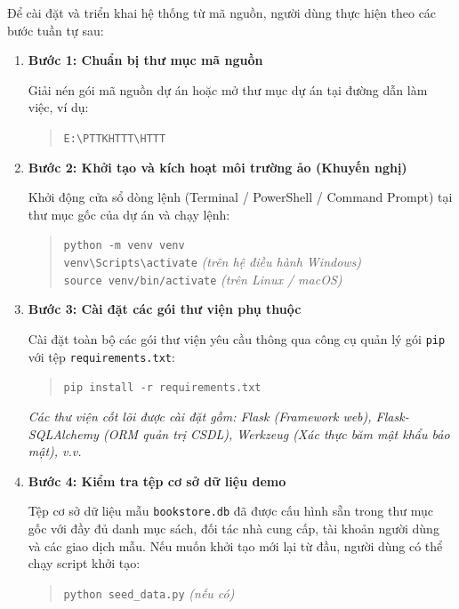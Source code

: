 \documentclass[12pt,a4paper]{article}
\begin{document}
Để cài đặt và triển khai hệ thống từ mã nguồn, người dùng thực hiện theo các bước tuần tự sau:

\begin{enumerate}
    \item \textbf{Bước 1: Chuẩn bị thư mục mã nguồn}
    
    Giải nén gói mã nguồn dự án hoặc mở thư mục dự án tại đường dẫn làm việc, ví dụ:
    \begin{quote}
        \texttt{E:\textbackslash PTTKHTTT\textbackslash HTTT}
    \end{quote}

    \item \textbf{Bước 2: Khởi tạo và kích hoạt môi trường ảo (Khuyến nghị)}
    
    Khởi động cửa sổ dòng lệnh (Terminal / PowerShell / Command Prompt) tại thư mục gốc của dự án và chạy lệnh:
    \begin{quote}
        \texttt{python -m venv venv}\\
        \texttt{venv\textbackslash Scripts\textbackslash activate} \quad \textit{(trên hệ điều hành Windows)}\\
        \texttt{source venv/bin/activate} \quad \textit{(trên Linux / macOS)}
    \end{quote}

    \item \textbf{Bước 3: Cài đặt các gói thư viện phụ thuộc}
    
    Cài đặt toàn bộ các gói thư viện yêu cầu thông qua công cụ quản lý gói \texttt{pip} với tệp \texttt{requirements.txt}:
    \begin{quote}
        \texttt{pip install -r requirements.txt}
    \end{quote}
    \textit{Các thư viện cốt lõi được cài đặt gồm: Flask (Framework web), Flask-SQLAlchemy (ORM quản trị CSDL), Werkzeug (Xác thực băm mật khẩu bảo mật), v.v.}

    \item \textbf{Bước 4: Kiểm tra tệp cơ sở dữ liệu demo}
    
    Tệp cơ sở dữ liệu mẫu \texttt{bookstore.db} đã được cấu hình sẵn trong thư mục gốc với đầy đủ danh mục sách, đối tác nhà cung cấp, tài khoản người dùng và các giao dịch mẫu. Nếu muốn khởi tạo mới lại từ đầu, người dùng có thể chạy script khởi tạo:
    \begin{quote}
        \texttt{python seed\_data.py} \quad \textit{(nếu có)}
    \end{quote}


\end{enumerate}
\end{document}
